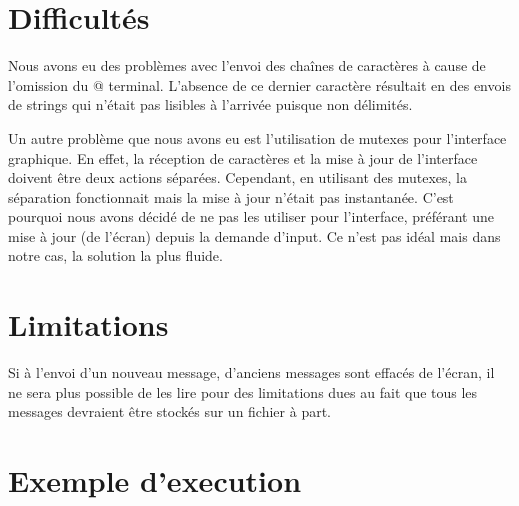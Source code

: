 \section{Difficultés}

Nous avons eu des problèmes avec l'envoi des chaînes de
caractères à cause de l'omission du \verb@\0@ terminal.
L'absence de ce dernier caractère résultait en des envois de strings
qui n'était pas lisibles à l'arrivée puisque non délimités.

Un autre problème que nous avons eu est l'utilisation de
mutexes pour l'interface graphique. En effet, la réception
de caractères et la mise à jour de l'interface doivent être
deux actions séparées. Cependant, en utilisant des mutexes,
la séparation fonctionnait mais la mise à jour n'était pas
instantanée. C'est pourquoi nous avons décidé de ne pas les
utiliser pour l'interface, préférant une mise à jour (de
l'écran) depuis la demande d'input. Ce n'est pas idéal mais
dans notre cas, la solution la plus fluide.

\section{Limitations}
Si à l'envoi d'un nouveau message, d'anciens messages sont effacés de l'écran,
il ne sera plus possible de les lire pour des limitations dues au fait que tous les messages
devraient être stockés sur un fichier à part.

\section{Exemple d'execution}
